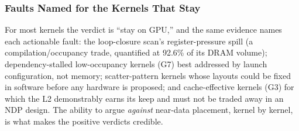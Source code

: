 \subsubsection{Faults Named for the Kernels That Stay}
\label{sec:syn-faults}

For most kernels the verdict is “stay on GPU,” and the same evidence names each actionable fault: the loop-closure scan’s register-pressure spill (a compilation/occupancy trade, quantified at 92.6\% of its DRAM volume); dependency-stalled low-occupancy kernels (G7) best addressed by launch configuration, not memory; scatter-pattern kernels whose layouts could be fixed in software before any hardware is proposed; and cache-effective kernels (G3) for which the L2 demonstrably earns its keep and must not be traded away in an NDP design. The ability to argue \emph{against} near-data placement, kernel by kernel, is what makes the positive verdicts credible.
